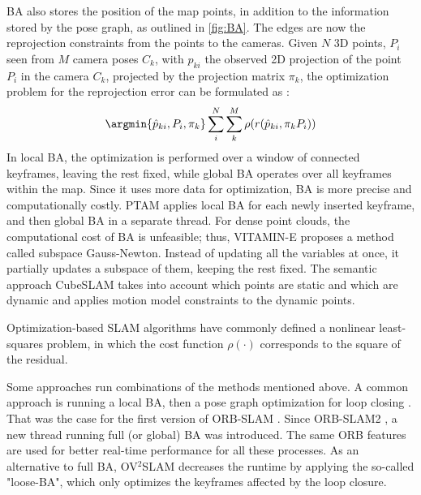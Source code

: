 \ac{BA} also stores the position of the map points, in addition to the information stored by the pose graph, as outlined in \ref{fig:BA}. The edges are now the reprojection constraints from the points to the cameras. Given $N$ 3D points, $P_i$ seen from $M$ camera poses $C_k$, with $p_{ki}$ the observed 2D projection of the point  $P_i$ in the camera $C_k$, projected by the projection matrix $\pi_k$, the optimization problem for the reprojection error can be formulated as \cite{heyden2005multiplevgHyZ}:
    \begin{equation}
        \argmin{\hat{p}_{ki},P_i,\pi_k} \sum^N_i \sum^M_k \rho(r(\hat{p}_{ki}, \pi_kP_i))
    \end{equation}
     In local \ac{BA}, the optimization is performed over a window of connected keyframes, leaving the rest fixed, while global \ac{BA} operates over all keyframes within the map. Since it uses more data for optimization, \ac{BA} is more precise and computationally costly. PTAM applies local \ac{BA} for each newly inserted keyframe, and then global \ac{BA} in a separate thread. For dense point clouds, the computational cost of \ac{BA} is unfeasible; thus, VITAMIN-E  \cite{Yokozuka_2019vitamine} proposes a method called subspace Gauss-Newton. Instead of updating all the variables at once, it partially updates a subspace of them, keeping the rest fixed. The semantic approach CubeSLAM \cite{yang2019cubeslam} takes into account which points are static and which are dynamic and applies motion model constraints to the dynamic points.
 

Optimization-based SLAM algorithms have commonly defined a nonlinear least-squares problem, in which the cost function $\rho(\cdot)$ corresponds to the square of the residual.

Some approaches run combinations of the methods mentioned above. A common approach is running a local \ac{BA}, then a pose graph optimization for loop closing \cite{qin2018vins-mono,bruno2021lift,cui2019sof-slam,mur2015orb,liu2021rds-slam}.
That was the case for the first version of ORB-SLAM \cite{mur2015orb}. Since ORB-SLAM2 \cite{mur2017orbslam2}, a new thread running full (or global) \ac{BA} was introduced. The same ORB features are used for better real-time performance for all these processes. As an alternative to full \ac{BA}, OV$^2$SLAM decreases the runtime by applying the so-called "loose-BA", which only optimizes the keyframes affected by the loop closure. 

